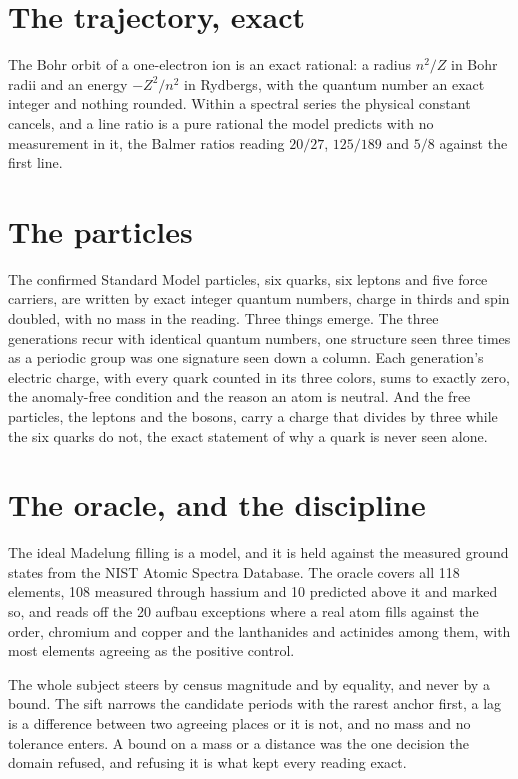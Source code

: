 \section{The trajectory, exact}

The Bohr orbit of a one-electron ion is an exact rational: a radius $n^2/Z$ in Bohr radii and an energy
$-Z^2/n^2$ in Rydbergs, with the quantum number an exact integer and nothing rounded. Within a spectral
series the physical constant cancels, and a line ratio is a pure rational the model predicts with no
measurement in it, the Balmer ratios reading $20/27$, $125/189$ and $5/8$ against the first line.

\section{The particles}

The confirmed Standard Model particles, six quarks, six leptons and five force carriers, are written by
exact integer quantum numbers, charge in thirds and spin doubled, with no mass in the reading. Three
things emerge. The three generations recur with identical quantum numbers, one structure seen three
times as a periodic group was one signature seen down a column. Each generation's electric charge, with
every quark counted in its three colors, sums to exactly zero, the anomaly-free condition and the reason
an atom is neutral. And the free particles, the leptons and the bosons, carry a charge that divides by
three while the six quarks do not, the exact statement of why a quark is never seen alone.

\section{The oracle, and the discipline}

The ideal Madelung filling is a model, and it is held against the measured ground states from the NIST
Atomic Spectra Database. The oracle covers all 118 elements, 108 measured through hassium and 10
predicted above it and marked so, and reads off the 20 aufbau exceptions where a real atom fills against
the order, chromium and copper and the lanthanides and actinides among them, with most elements agreeing
as the positive control.

The whole subject steers by census magnitude and by equality, and never by a bound. The sift narrows the
candidate periods with the rarest anchor first, a lag is a difference between two agreeing places or it
is not, and no mass and no tolerance enters. A bound on a mass or a distance was the one decision the
domain refused, and refusing it is what kept every reading exact.
